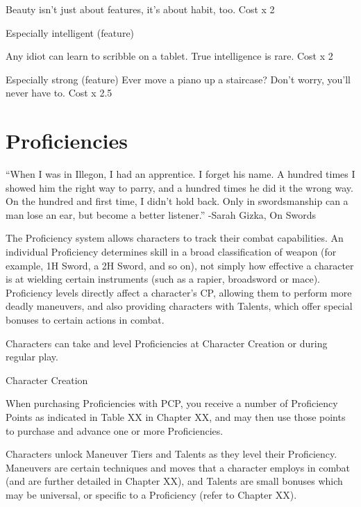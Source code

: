\documentclass[oneside,11pt,english]{book}
\begin{document}
Beauty isn’t just about features, it’s about habit, too. Cost x 2 

Especially intelligent 
(feature) 

Any idiot can learn to scribble on a tablet. True intelligence is rare. Cost x 2 

Especially strong (feature) Ever move a piano up a staircase? Don’t worry, you’ll never have to. Cost x 
2.5 

 

 

\chapter{Proficiencies}\label{ch:proficiencies}
\startcontents[chapters]
\clearpage
 

“When I was in Illegon, I had an apprentice. I forget his name. A hundred times I showed him the right way to parry, and a 
hundred times he did it the wrong way. On the hundred and first time, I didn’t hold back. Only in swordsmanship can a man lose 
an ear, but become a better listener.” 
-Sarah Gizka, On Swords 
 

 

The Proficiency system allows characters to track their combat capabilities. An individual Proficiency 
determines skill in a broad classification of weapon (for example, 1H Sword, a 2H Sword, and so on), not 
simply how effective a character is at wielding certain instruments (such as a rapier, broadsword or 
mace). Proficiency levels directly affect a character’s CP, allowing them to perform more deadly 
maneuvers, and also providing characters with Talents, which offer special bonuses to certain actions in 
combat. 


 

Characters can take and level Proficiencies at Character Creation or during regular play. 

 

Character Creation 

 

When purchasing Proficiencies with PCP, you receive a number of Proficiency Points as indicated in 
Table XX in Chapter XX, and may then use those points to purchase and advance one or more 
Proficiencies. 

 

Characters unlock Maneuver Tiers and Talents as they level their Proficiency. Maneuvers are certain 
techniques and moves that a character employs in combat (and are further detailed in Chapter XX), and 
Talents are small bonuses which may be universal, or specific to a Proficiency (refer to Chapter XX). 
\end{document}
